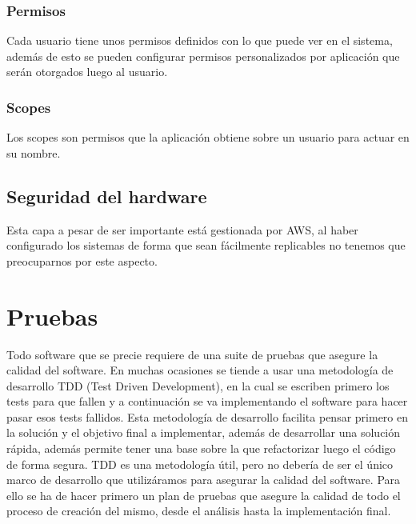 \documentclass[12pt,a4paperpaper,]{report}
\begin{document}
\subsection{Permisos}\label{permisos}

Cada usuario tiene unos permisos definidos con lo que puede ver en el
sistema, además de esto se pueden configurar permisos personalizados por
aplicación que serán otorgados luego al usuario.

\subsection{Scopes}\label{scopes}

Los scopes son permisos que la aplicación obtiene sobre un usuario para
actuar en su nombre.

\section{Seguridad del hardware}\label{seguridad-del-hardware}

Esta capa a pesar de ser importante está gestionada por AWS, al haber
configurado los sistemas de forma que sean fácilmente replicables no
tenemos que preocuparnos por este aspecto.

\chapter{Pruebas}\label{pruebas-1}

Todo software que se precie requiere de una suite de pruebas que asegure
la calidad del software. En muchas ocasiones se tiende a usar una
metodología de desarrollo TDD (Test Driven Development), en la cual se
escriben primero los tests para que fallen y a continuación se va
implementando el software para hacer pasar esos tests fallidos. Esta
metodología de desarrollo facilita pensar primero en la solución y el
objetivo final a implementar, además de desarrollar una solución rápida,
además permite tener una base sobre la que refactorizar luego el código
de forma segura. TDD es una metodología útil, pero no debería de ser el
único marco de desarrollo que utilizáramos para asegurar la calidad del
software. Para ello se ha de hacer primero un plan de pruebas que
asegure la calidad de todo el proceso de creación del mismo, desde el
análisis hasta la implementación final.
\end{document}

